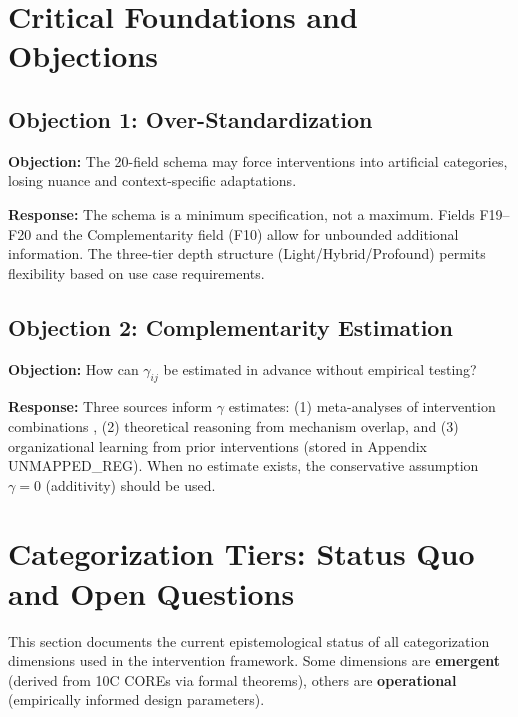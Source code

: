 \section{Critical Foundations and Objections}
\label{sec:hhh-foundations}

\subsection{Objection 1: Over-Standardization}

\textbf{Objection:} The 20-field schema may force interventions into artificial categories, losing nuance and context-specific adaptations.

\textbf{Response:} The schema is a minimum specification, not a maximum. Fields F19--F20 and the Complementarity field (F10) allow for unbounded additional information. The three-tier depth structure (Light/Hybrid/Profound) permits flexibility based on use case requirements.

\subsection{Objection 2: Complementarity Estimation}

\textbf{Objection:} How can $\gamma_{ij}$ be estimated in advance without empirical testing?

\textbf{Response:} Three sources inform $\gamma$ estimates: (1) meta-analyses of intervention combinations \citep{johnson2021}, (2) theoretical reasoning from mechanism overlap, and (3) organizational learning from prior interventions (stored in Appendix UNMAPPED_REG). When no estimate exists, the conservative assumption $\gamma = 0$ (additivity) should be used.


\section{Categorization Tiers: Status Quo and Open Questions}
\label{sec:hhh-categorization-tiers}

This section documents the current epistemological status of all categorization dimensions used in the intervention framework. Some dimensions are \textbf{emergent} (derived from 10C COREs via formal theorems), others are \textbf{operational} (empirically informed design parameters).

